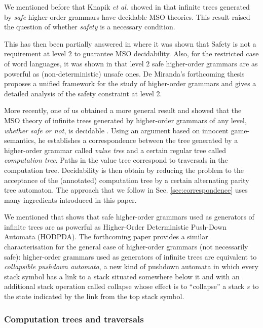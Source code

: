 \documentclass{llncs}
\begin{document}
We mentioned before that Knapik \emph{et al.} showed in \cite{KNU02} that infinite trees generated by \emph{safe} higher-order grammars have decidable MSO theories. 
This result raised the question of whether \emph{safety} is a necessary condition. 

This has then been partially answered in \cite{DBLP:conf/tlca/AehligMO05} where it was shown that Safety is not a requirement at level $2$ to guarantee MSO decidability. Also, for the restricted case of word languages, it was shown in \cite{DBLP:conf/fossacs/AehligMO05} that level $2$ safe higher-order grammars are as powerful as (non-deterministic) unsafe ones. 
De Miranda's forthcoming thesis \cite{demirandathesis} proposes a unified framework for the study of higher-order grammars and gives a detailed analysis of the safety constraint at level 2.

More recently, one of us obtained a more general result and showed that the MSO theory of infinite trees generated by higher-order grammars of any level, \emph{whether safe or not}, is decidable \cite{OngLics2006}.
Using an argument based on innocent game-semantics, he establishes a correspondence between the tree generated by a higher-order grammar called \emph{value tree} and a certain regular tree called  \emph{computation tree}. Paths in the value tree correspond to traversals in the computation tree.
Decidability is then obtain by reducing the problem to the acceptance of the (annotated) computation tree by a certain alternating parity tree automaton.
The approach that we follow in Sec. \ref{sec:correspondence} uses many ingredients introduced in this paper.


We mentioned that \cite{KNU02} shows that safe higher-order grammars used as generators of infinite trees are as powerful as Higher-Order Deterministic Push-Down Automata (HODPDA).
The forthcoming paper \cite{hague-sto07} provides a similar characterisation for the general case of higher-order grammars (not necessarily safe): higher-order grammars used as generators of infinite trees are equivalent to \emph{collapsible pushdown automata}, a new kind of pushdown automata in which every stack symbol has a link to a stack situated somewhere below it and with an additional stack operation called collapse whose effect is to ``collapse'' a stack $s$ to the state indicated by the link from the top stack symbol.

\subsubsection{Computation trees and traversals}
\end{document}
